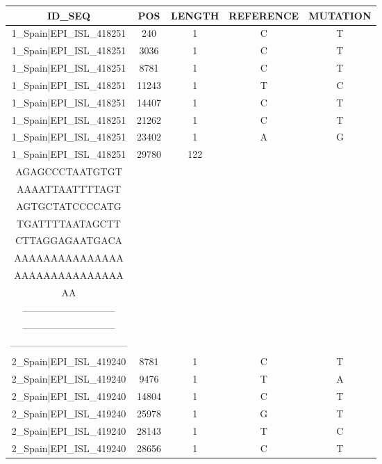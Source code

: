 \documentclass[a4paper,10pt]{article}
\begin{document}
\setlength\LTleft{-2 cm}
\begin{longtable}{@{}ccccc@{}}
\toprule
\textbf{ID\_SEQ} & \textbf{POS} & \textbf{LENGTH} & \textbf{REFERENCE} & \textbf{MUTATION} \\* \midrule
\endfirsthead
%
\cline{1-5}
\endhead
%
1\_Spain|EPI\_ISL\_418251 & 240 & 1 & C & T \\* \midrule
1\_Spain|EPI\_ISL\_418251 & 3036 & 1 & C & T \\* \midrule
1\_Spain|EPI\_ISL\_418251 & 8781 & 1 & C & T \\* \midrule
1\_Spain|EPI\_ISL\_418251 & 11243 & 1 & T & C \\* \midrule
1\_Spain|EPI\_ISL\_418251 & 14407 & 1 & C & T \\* \midrule
1\_Spain|EPI\_ISL\_418251 & 21262 & 1 & C & T \\* \midrule
1\_Spain|EPI\_ISL\_418251 & 23402 & 1 & A & G \\* \midrule
1\_Spain|EPI\_ISL\_418251 & 29780 & 122 & \begin{tabular}[c]{@{}c@{}}AGCTGCCTATATGGA\\ AGAGCCCTAATGTGT\\ AAAATTAATTTTAGT\\ AGTGCTATCCCCATG\\ TGATTTTAATAGCTT\\ CTTAGGAGAATGACA\\ AAAAAAAAAAAAAAA\\ AAAAAAAAAAAAAAA\\ AA\end{tabular} & \begin{tabular}[c]{@{}c@{}}----------------------------\\ -----------------------------\\ -----------------------------\\ ------------------------------------\end{tabular} \\* \midrule
2\_Spain|EPI\_ISL\_419240 & 8781 & 1 & C & T \\* \midrule
2\_Spain|EPI\_ISL\_419240 & 9476 & 1 & T & A \\* \midrule
2\_Spain|EPI\_ISL\_419240 & 14804 & 1 & C & T \\* \midrule
2\_Spain|EPI\_ISL\_419240 & 25978 & 1 & G & T \\* \midrule
2\_Spain|EPI\_ISL\_419240 & 28143 & 1 & T & C \\* \midrule
2\_Spain|EPI\_ISL\_419240 & 28656 & 1 & C & T \\* \midrule

\end{longtable}
\end{document}
